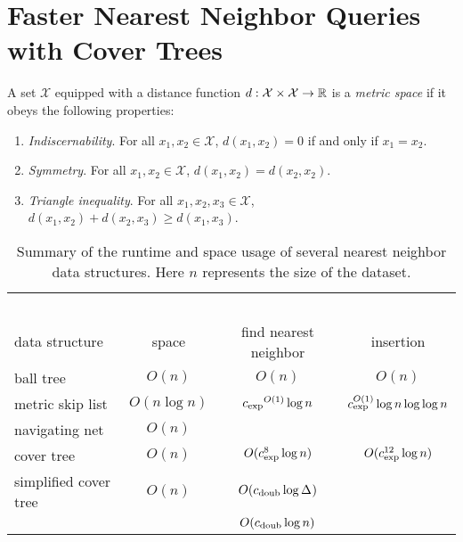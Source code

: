 \documentclass[../main.tex]{subfiles}
\newcommand{\set}[1]{\mathcal {#1}}
\newcommand{\dist}[2]{\distf({#1},{#2})}
\newcommand{\distf}{d}
\newcommand{\aspect}[1]{\Delta_{#1}}
\newcommand{\cexp}{c_\textnormal{exp}}
\newcommand{\cdoub}{c_\textnormal{doub}}
\begin{document}
\chapter{Faster Nearest Neighbor Queries with Cover Trees}

\begin{definition}
    A set $\set X$ equipped with a distance function $\distf : \set X \times \set X \to \R$ is a \emph{metric space} if it obeys the following properties:
    \begin{enumerate}
        \item \emph{Indiscernability}.  For all $x_1,x_2\in\set X$, $\dist{x_1}{x_2} = 0$ if and only if $x_1=x_2$.
        \item \emph{Symmetry}. For all $x_1,x_2\in\set X$, $\dist{x_1}{x_2} = \dist{x_2}{x_2}$.
        \item \emph{Triangle inequality}.  For all $x_1,x_2,x_3\in\set X$, $\dist{x_1}{x_2} + \dist{x_2}{x_3}\ge\dist{x_1}{x_3}$.
    \end{enumerate}
\end{definition}

\begin{table}[H]
    \small
    \centering
    \begin{tabular}{lccc}
        \toprule
        \vspace{-0.25in}
        &~\hspace{1.2in}~&~\hspace{1.2in}~&~\hspace{1.2in}~\\
        data structure & space & find nearest neighbor & insertion \\
        \midrule
        ball tree \cite{} & $O(n)$ & $O(n)$ & $O(n)$ \\
        metric skip list \cite{karger2002finding} & $O(n\log n)$ & $\cexp{}^{O(1)}\log n$ & $\cexp^{O(1)}\log n\log\log n$ \\
        navigating net \cite{} & $O(n)$ \\
        cover tree \cite{} & $O(n)$ & $O(\cexp^8\log n)$ & $O(\cexp^{12}\log n)$ \\
        simplified cover tree & $O(n)$ & $O(\cdoub{}\log \aspect{})$ \\
                              &        & $O(\cdoub{}\log n)$ \\
        \bottomrule
    \end{tabular}
    \caption{
        Summary of the runtime and space usage of several nearest neighbor data structures.
        Here $n$ represents the size of the dataset.
    }
\end{table}
\end{document}
